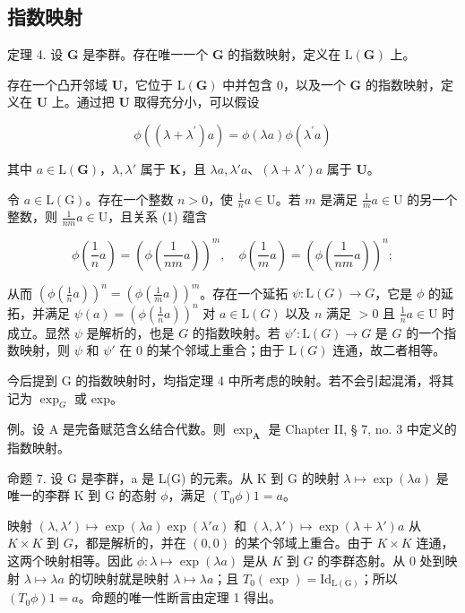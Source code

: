 \subsection{指数映射}

定理 4. 设 \(\mathbf{G}\) 是李群。存在唯一一个 \(\mathbf{G}\) 的指数映射，定义在 \(\mathrm{L}(\mathbf{G})\) 上。

存在一个凸开邻域 \(\mathbf{U}\)，它位于 \(\mathrm{L}(\mathbf{G})\) 中并包含 0，以及一个 \(\mathbf{G}\) 的指数映射，定义在 \(\mathbf{U}\) 上。通过把 \(\mathbf{U}\) 取得充分小，可以假设

\[
\phi ((\lambda + \lambda^ {\prime}) a) = \phi (\lambda a) \phi (\lambda^ {\prime} a)\tag{1}
\]

其中 \(a \in \mathrm{L}(\mathbf{G})\)，\(\lambda, \lambda'\) 属于 \(\mathbf{K}\)，且 \(\lambda a, \lambda'a\)、\((\lambda + \lambda')a\) 属于 \(\mathbf{U}\)。

令 \(a \in \mathrm{L}(\mathrm{G})\)。存在一个整数 \(n > 0\)，使 \(\frac{1}{n} a \in \mathrm{U}\)。若 \(m\) 是满足 \(\frac{1}{m} a \in \mathrm{U}\) 的另一个整数，则 \(\frac{1}{nm} a \in \mathrm{U}\)，且关系 (1) 蕴含

\[
\phi \left(\frac {1}{n} a\right) = \left(\phi \left(\frac {1}{n m} a\right)\right) ^ {m}, \quad \phi \left(\frac {1}{m} a\right) = \left(\phi \left(\frac {1}{n m} a\right)\right) ^ {n};
\]

从而 \(\left(\phi\left(\frac{1}{n}a\right)\right)^n = \left(\phi\left(\frac{1}{m}a\right)\right)^m\)。存在一个延拓 \(\psi: \mathrm{L}(G) \to G\)，它是 \(\phi\) 的延拓，并满足 \(\psi(a) = \left(\phi\left(\frac{1}{n}a\right)\right)^n\) 对 \(a \in \mathrm{L}(G)\) 以及 \(n\) 满足 \(>0\) 且 \(\frac{1}{n}a \in \mathrm{U}\) 时成立。显然 \(\psi\) 是解析的，也是 \(G\) 的指数映射。若 \(\psi': \mathrm{L}(G) \to G\) 是 \(G\) 的一个指数映射，则 \(\psi\) 和 \(\psi'\) 在 0 的某个邻域上重合；由于 \(\mathrm{L}(G)\) 连通，故二者相等。

今后提到 G 的指数映射时，均指定理 4 中所考虑的映射。若不会引起混淆，将其记为 \(\exp_{G}\) 或 exp。

例。设 A 是完备赋范含幺结合代数。则 \(\exp_{\mathbf{A}}\) 是 Chapter II, § 7, no. 3 中定义的指数映射。

命题 7. 设 G 是李群，a 是 L(G) 的元素。从 K 到 G 的映射 \(\lambda \mapsto \exp(\lambda a)\) 是唯一的李群 K 到 G 的态射 \(\phi\)，满足 \((\mathrm{T}_0\phi)1 = a\)。

映射 \((\lambda, \lambda') \mapsto \exp(\lambda a) \exp(\lambda' a)\) 和 \((\lambda, \lambda') \mapsto \exp(\lambda + \lambda') a\) 从 \(K \times K\) 到 \(G\)，都是解析的，并在 \((0, 0)\) 的某个邻域上重合。由于 \(K \times K\) 连通，这两个映射相等。因此 \(\phi: \lambda \mapsto \exp(\lambda a)\) 是从 \(K\) 到 \(G\) 的李群态射。从 \(0\) 处到映射 \(\lambda \mapsto \lambda a\) 的切映射就是映射 \(\lambda \mapsto \lambda a\)；且 \(T_0(\exp) = \mathrm{Id}_{\mathrm{L}(\mathrm{G})}\)；所以 \((T_0\phi)1 = a\)。命题的唯一性断言由定理 1 得出。

